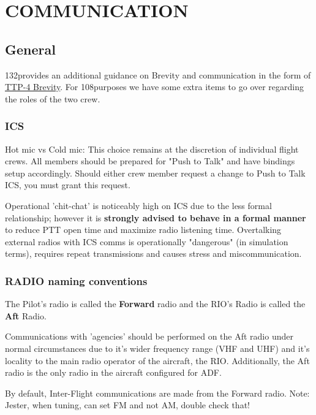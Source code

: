 \section{COMMUNICATION}

\subsection{General}

132\nd provides an additional guidance on Brevity and communication in the form
of \href{https://cloud.132virtualwing.org/s/4TPtFDbmPbw9oWM}{TTP-4 Brevity}.
For 108\th purposes we have some extra items to go over regarding the roles of
the two crew.

\subsubsection{ICS}

Hot mic vs Cold mic: This choice remains at the discretion of individual flight
crews. All members should be prepared for "Push to Talk" and have bindings
setup accordingly. Should either crew member request a change to Push to
Talk ICS, you must grant this request.

Operational 'chit-chat' is noticeably high on ICS due to the less formal
relationship; however it is \textbf{strongly advised to behave in a formal
manner} to reduce PTT open time and maximize radio listening time. Overtalking
external radios with ICS comms is operationally "dangerous" (in simulation
terms), requires repeat transmissions and causes stress and miscommunication.

\subsubsection{RADIO naming conventions}
\label{sec:communications-radio-naming}

The Pilot's radio is called the \textbf{Forward} radio and the RIO's Radio is
called the \textbf{Aft} Radio.

Communications with 'agencies' should be performed on the Aft radio under
normal circumstances due to it's wider frequency range (VHF and UHF) and it's
locality to the main radio operator of the aircraft, the RIO. Additionally, the
Aft radio is the only radio in the aircraft configured for ADF.

By default, Inter-Flight communications are made from the Forward radio. Note:
Jester, when tuning, can set FM and not AM, double check that!

